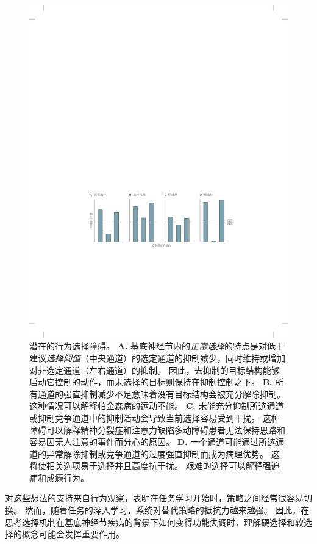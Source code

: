\begin{figure}[htbp]
	\centering
	\includegraphics[width=0.9\linewidth]{chap38/fig_38_9}
	\caption{潜在的行为选择障碍。
		\textbf{A.} 基底神经节内的\textit{正常选择}的特点是对低于建议\textit{选择阈值}（中央通道）的选定通道的抑制减少，同时维持或增加对非选定通道（左右通道）的抑制。
		因此，去抑制的目标结构能够启动它控制的动作，而未选择的目标则保持在抑制控制之下。
		\textbf{B.} 所有通道的强直抑制减少不足意味着没有目标结构会被充分解除抑制。
		这种情况可以解释帕金森病的运动不能。
		\textbf{C.} 未能充分抑制所选通道或抑制竞争通道中的抑制活动会导致当前选择容易受到干扰。
		这种障碍可以解释精神分裂症和注意力缺陷多动障碍患者无法保持思路和容易因无人注意的事件而分心的原因。
		\textbf{D.} 一个通道可能通过所选通道的异常解除抑制或竞争通道的过度强直抑制而成为病理优势。
		这将使相关选项易于选择并且高度抗干扰。
		艰难的选择可以解释强迫症和成瘾行为。}
	\label{fig:38_9}
\end{figure}


对这些想法的支持来自行为观察，表明在任务学习开始时，策略之间经常很容易切换。
然而，随着任务的深入学习，系统对替代策略的抵抗力越来越强。
因此，在思考选择机制在基底神经节疾病的背景下如何变得功能失调时，理解硬选择和软选择的概念可能会发挥重要作用。



